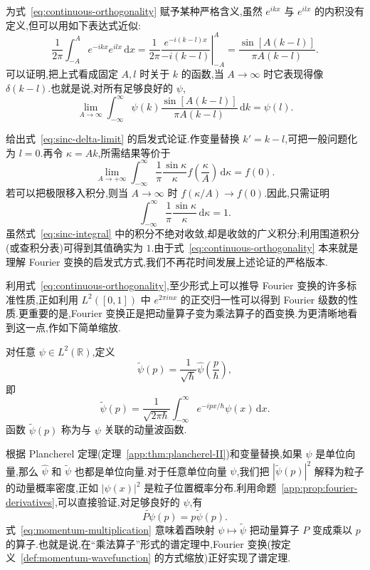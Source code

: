 为式~\eqref{eq:continuous-orthogonality} 赋予某种严格含义,虽然 \(e^{ikx}\) 与 \(e^{ilx}\) 的内积没有定义,但可以用如下表达式近似:
\[
\frac{1}{2\pi}\int_{-A}^{A}e^{-ikx}e^{ilx}\,\mathrm{d}x
=\frac{1}{2\pi}\left.\frac{e^{-i(k-l)x}}{-i(k-l)}\right|_{-A}^{A}
=\frac{\sin[A(k-l)]}{\pi A(k-l)}.
\]
可以证明,把上式看成固定 \(A,l\) 时关于 \(k\) 的函数,当 \(A\to\infty\) 时它表现得像 \(\delta(k-l)\).也就是说,对所有足够良好的 \(\psi\),
\begin{equation}
\lim_{A\to\infty}\int_{-\infty}^{\infty}\psi(k)
\frac{\sin[A(k-l)]}{\pi A(k-l)}\,\mathrm{d}k
=\psi(l).
\label{eq:sinc-delta-limit}
\end{equation}

给出式~\eqref{eq:sinc-delta-limit} 的启发式论证.作变量替换 \(k'=k-l\),可把一般问题化为 \(l=0\).再令 \(\kappa=Ak\),所需结果等价于
\begin{equation}
\lim_{A\to+\infty}\int_{-\infty}^{\infty}
\frac{1}{\pi}\frac{\sin\kappa}{\kappa}f\left(\frac{\kappa}{A}\right)\,\mathrm{d}\kappa
=f(0).
\label{eq:sinc-limit-scaled}
\end{equation}
若可以把极限移入积分,则当 \(A\to\infty\) 时 \(f(\kappa/A)\to f(0)\).因此,只需证明
\begin{equation}
\int_{-\infty}^{\infty}\frac{1}{\pi}\frac{\sin\kappa}{\kappa}\,\mathrm{d}\kappa=1.
\label{eq:sinc-integral}
\end{equation}
虽然式~\eqref{eq:sinc-integral} 中的积分不绝对收敛,却是收敛的广义积分;利用围道积分(或查积分表)可得到其值确实为 \(1\).由于式~\eqref{eq:continuous-orthogonality} 本来就是理解 Fourier 变换的启发式方式,我们不再花时间发展上述论证的严格版本.

利用式~\eqref{eq:continuous-orthogonality},至少形式上可以推导 Fourier 变换的许多标准性质,正如利用 \(L^{2}([0,1])\) 中 \(e^{2\pi inx}\) 的正交归一性可以得到 Fourier 级数的性质.更重要的是,Fourier 变换正是把动量算子变为乘法算子的酉变换.为更清晰地看到这一点,作如下简单缩放.

\begin{definition}[动量波函数]\label{def:momentum-wavefunction}
对任意 \(\psi\in L^{2}(\mathbb{R})\),定义
\[
\widetilde\psi(p)=\frac{1}{\sqrt{\hbar}}\widehat\psi\left(\frac{p}{\hbar}\right),
\]
即
\[
\widetilde\psi(p)=\frac{1}{\sqrt{2\pi\hbar}}
\int_{-\infty}^{\infty}e^{-ipx/\hbar}\psi(x)\,\mathrm{d}x.
\]
函数 \(\widetilde\psi(p)\) 称为与 \(\psi\) 关联的动量波函数.
\end{definition}

根据 Plancherel 定理(定理~\ref{app:thm:plancherel-II})和变量替换,如果 \(\psi\) 是单位向量,那么 \(\widehat\psi\) 和 \(\widetilde\psi\) 也都是单位向量.对于任意单位向量 \(\psi\),我们把 \(|\widetilde\psi(p)|^{2}\) 解释为粒子的动量概率密度,正如 \(|\psi(x)|^{2}\) 是粒子位置概率分布.利用命题~\ref{app:prop:fourier-derivatives},可以直接验证,对足够良好的 \(\psi\),有
\begin{equation}
\widetilde{P\psi}(p)=p\widetilde\psi(p).
\label{eq:momentum-multiplication}
\end{equation}
式~\eqref{eq:momentum-multiplication} 意味着酉映射 \(\psi\mapsto\widetilde\psi\) 把动量算子 \(P\) 变成乘以 \(p\) 的算子.也就是说,在“乘法算子”形式的谱定理中,Fourier 变换(按定义~\ref{def:momentum-wavefunction} 的方式缩放)正好实现了谱定理.


